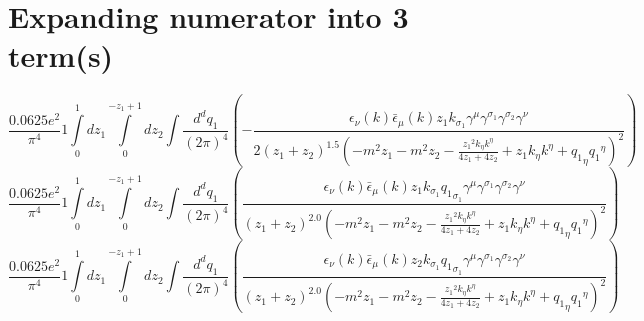 \section*{Expanding numerator into 3 term(s)}
\begin{dmath}\frac{0.0625 e^{2}}{\pi^{4}}1\int\limits_{ 0 }^{ 1 } d{ z_{ 1 } }\int\limits_{ 0 }^{ - { z_{ 1 } } + 1 } d{ z_{ 2 } }\int\frac{d^d q_1 }{ (2\pi)^4 }\left(- \frac{\epsilon_{ \nu }({ k }) \bar{\epsilon}_{ \mu }({ k }) { z_{ 1 } } { { k }_{ \sigma_1 } } { \gamma^{ \mu } } { \gamma^{ \sigma_1 } } { \gamma^{ \sigma_2 } } { \gamma^{ \nu } }}{2 \left({ z_{ 1 } } + { z_{ 2 } }\right)^{1.5} \left(- m^{2} { z_{ 1 } } - m^{2} { z_{ 2 } } - \frac{{ z_{ 1 } }^{2} { { k }_{ \eta } } { { k }^{ \eta } }}{4 { z_{ 1 } } + 4 { z_{ 2 } }} + { z_{ 1 } } { { k }_{ \eta } } { { k }^{ \eta } } + { { q_1 }_{ \eta } } { { q_1 }^{ \eta } }\right)^{2}}\right)\end{dmath}
\begin{dmath}\frac{0.0625 e^{2}}{\pi^{4}}1\int\limits_{ 0 }^{ 1 } d{ z_{ 1 } }\int\limits_{ 0 }^{ - { z_{ 1 } } + 1 } d{ z_{ 2 } }\int\frac{d^d q_1 }{ (2\pi)^4 }\left(\frac{\epsilon_{ \nu }({ k }) \bar{\epsilon}_{ \mu }({ k }) { z_{ 1 } } { { k }_{ \sigma_1 } } { { q_1 }_{ \sigma_1 } } { \gamma^{ \mu } } { \gamma^{ \sigma_1 } } { \gamma^{ \sigma_2 } } { \gamma^{ \nu } }}{\left({ z_{ 1 } } + { z_{ 2 } }\right)^{2.0} \left(- m^{2} { z_{ 1 } } - m^{2} { z_{ 2 } } - \frac{{ z_{ 1 } }^{2} { { k }_{ \eta } } { { k }^{ \eta } }}{4 { z_{ 1 } } + 4 { z_{ 2 } }} + { z_{ 1 } } { { k }_{ \eta } } { { k }^{ \eta } } + { { q_1 }_{ \eta } } { { q_1 }^{ \eta } }\right)^{2}}\right)\end{dmath}
\begin{dmath}\frac{0.0625 e^{2}}{\pi^{4}}1\int\limits_{ 0 }^{ 1 } d{ z_{ 1 } }\int\limits_{ 0 }^{ - { z_{ 1 } } + 1 } d{ z_{ 2 } }\int\frac{d^d q_1 }{ (2\pi)^4 }\left(\frac{\epsilon_{ \nu }({ k }) \bar{\epsilon}_{ \mu }({ k }) { z_{ 2 } } { { k }_{ \sigma_1 } } { { q_1 }_{ \sigma_1 } } { \gamma^{ \mu } } { \gamma^{ \sigma_1 } } { \gamma^{ \sigma_2 } } { \gamma^{ \nu } }}{\left({ z_{ 1 } } + { z_{ 2 } }\right)^{2.0} \left(- m^{2} { z_{ 1 } } - m^{2} { z_{ 2 } } - \frac{{ z_{ 1 } }^{2} { { k }_{ \eta } } { { k }^{ \eta } }}{4 { z_{ 1 } } + 4 { z_{ 2 } }} + { z_{ 1 } } { { k }_{ \eta } } { { k }^{ \eta } } + { { q_1 }_{ \eta } } { { q_1 }^{ \eta } }\right)^{2}}\right)\end{dmath}
